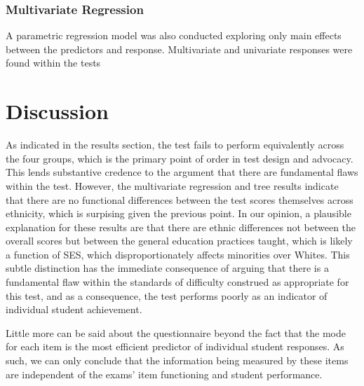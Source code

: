 \documentclass{article}\usepackage[]{graphicx}\usepackage[]{color}
\begin{document}
\subsubsection{Multivariate Regression}
A parametric regression model was also conducted exploring only main effects between the predictors and response. Multivariate and univariate responses were found within the tests


\section{Discussion}
As indicated in the results section, the test fails to perform equivalently across the four groups, which is the primary point of order in test design and advocacy. This lends substantive credence to the argument that there are fundamental flaws within the test. However, the multivariate regression and tree results indicate that there are no functional differences between the test scores themselves across ethnicity, which is surpising given the previous point. In our opinion, a plausible explanation for these results are that there are ethnic differences not between the overall scores but between the general education practices taught, which is likely a function of SES, which disproportionately affects minorities over Whites. This subtle distinction has the immediate consequence of arguing that there is a fundamental flaw within the standards of difficulty construed as appropriate for this test, and as a consequence, the test performs poorly as an indicator of individual student achievement.

Little more can be said about the questionnaire beyond the fact that the mode for each item is the most efficient predictor of individual student responses. As such, we can only conclude that the information being measured by these items are independent of the exams' item functioning and student performance.


{}

\end{document}

